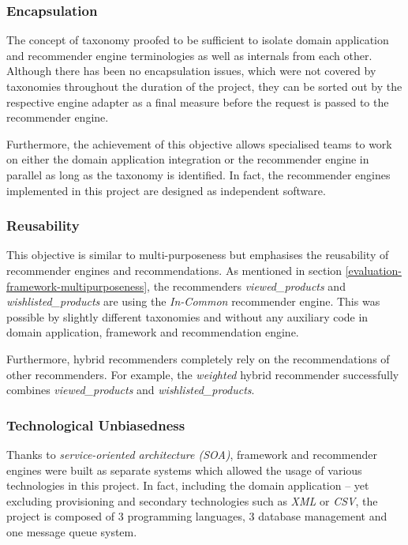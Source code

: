 \subsubsection{Encapsulation}

The concept of taxonomy proofed to be sufficient to isolate domain application and recommender engine terminologies as well as internals from each other. Although there has been no encapsulation issues, which were not covered by taxonomies throughout the duration of the project, they can be sorted out by the respective engine adapter as a final measure before the request is passed to the recommender engine.

Furthermore, the achievement of this objective allows specialised teams to work on either the domain application integration or the recommender engine in parallel as long as the taxonomy is identified. In fact, the recommender engines implemented in this project are designed as independent software.

\subsubsection{Reusability}

This objective is similar to multi-purposeness but emphasises the reusability of recommender engines and recommendations. As mentioned in section \ref{evaluation-framework-multipurposeness}, the recommenders \emph{viewed_products} and \emph{wishlisted_products} are using the \emph{In-Common} recommender engine. This was possible by slightly different taxonomies and without any auxiliary code in domain application, framework and recommendation engine.

Furthermore, hybrid recommenders completely rely on the recommendations of other recommenders. For example, the \emph{weighted} hybrid recommender successfully combines \emph{viewed_products} and \emph{wishlisted_products}.

\subsubsection{Technological Unbiasedness}

Thanks to \emph{service-oriented architecture (SOA)}, framework and recommender engines were built as separate systems which allowed the usage of various technologies in this project. In fact, including the domain application -- yet excluding provisioning and secondary technologies such as \emph{XML} or \emph{CSV}, the project is composed of 3 programming languages, 3 database management and one message queue system.

